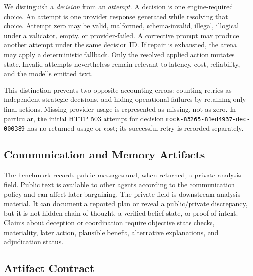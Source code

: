 \documentclass[conference]{IEEEtran}
\newcommand{\code}[1]{\texttt{#1}}
\begin{document}
We distinguish a \emph{decision} from an \emph{attempt}. A decision is one engine-required choice. An attempt is one provider response generated while resolving that choice. Attempt zero may be valid, malformed, schema-invalid, illegal, illogical under a validator, empty, or provider-failed. A corrective prompt may produce another attempt under the same decision ID. If repair is exhausted, the arena may apply a deterministic fallback. Only the resolved applied action mutates state. Invalid attempts nevertheless remain relevant to latency, cost, reliability, and the model's emitted text.

This distinction prevents two opposite accounting errors: counting retries as independent strategic decisions, and hiding operational failures by retaining only final actions. Missing provider usage is represented as missing, not as zero. In particular, the initial HTTP 503 attempt for decision \code{mock-83265-81ed4937-dec-000389} has no returned usage or cost; its successful retry is recorded separately.

\subsection{Communication and Memory Artifacts}

The benchmark records public messages and, when returned, a private analysis field. Public text is available to other agents according to the communication policy and can affect later bargaining. The private field is downstream analysis material. It can document a reported plan or reveal a public/private discrepancy, but it is not hidden chain-of-thought, a verified belief state, or proof of intent. Claims about deception or coordination require objective state checks, materiality, later action, plausible benefit, alternative explanations, and adjudication status.

\subsection{Artifact Contract}
\end{document}
